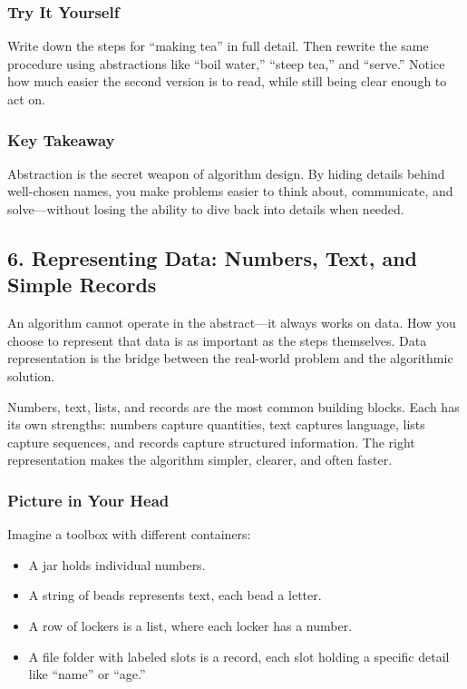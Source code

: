 \documentclass[
  letterpaper,
  DIV=11,
  numbers=noendperiod]{scrreprt}
\providecommand{\tightlist}{%
  \setlength{\itemsep}{0pt}\setlength{\parskip}{0pt}}
\begin{document}
\subsubsection{Try It Yourself}\label{try-it-yourself-4}

Write down the steps for ``making tea'' in full detail. Then rewrite the
same procedure using abstractions like ``boil water,'' ``steep tea,''
and ``serve.'' Notice how much easier the second version is to read,
while still being clear enough to act on.

\subsubsection{Key Takeaway}\label{key-takeaway-3}

Abstraction is the secret weapon of algorithm design. By hiding details
behind well-chosen names, you make problems easier to think about,
communicate, and solve---without losing the ability to dive back into
details when needed.

\subsection{6. Representing Data: Numbers, Text, and Simple
Records}\label{representing-data-numbers-text-and-simple-records}

An algorithm cannot operate in the abstract---it always works on data.
How you choose to represent that data is as important as the steps
themselves. Data representation is the bridge between the real-world
problem and the algorithmic solution.

Numbers, text, lists, and records are the most common building blocks.
Each has its own strengths: numbers capture quantities, text captures
language, lists capture sequences, and records capture structured
information. The right representation makes the algorithm simpler,
clearer, and often faster.

\subsubsection{Picture in Your Head}\label{picture-in-your-head-5}

Imagine a toolbox with different containers:

\begin{itemize}
\tightlist
\item
  A jar holds individual numbers.
\item
  A string of beads represents text, each bead a letter.
\item
  A row of lockers is a list, where each locker has a number.
\item
  A file folder with labeled slots is a record, each slot holding a
  specific detail like ``name'' or ``age.''
\end{itemize}
\end{document}
